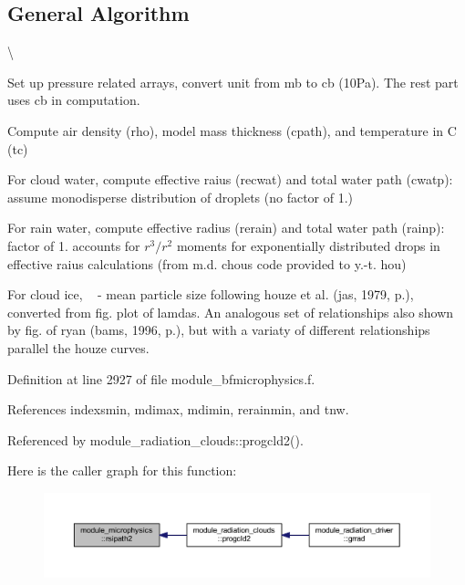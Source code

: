 \hypertarget{namespacemodule__radsw__main_general}{}\subsection{General Algorithm}\label{namespacemodule__radsw__main_general}
\textbackslash{} 
\begin{DoxyEnumerate}
\item Set up pressure related arrays, convert unit from mb to cb (10\+Pa). The rest part uses cb in computation.
\item Compute air density (rho), model mass thickness (cpath), and temperature in C (tc)
\item For cloud water, compute effective raius (recwat) and total water path (cwatp)\+: assume monodisperse distribution of droplets (no factor of 1.)
\item For rain water, compute effective radius (rerain) and total water path (rainp)\+: factor of 1. accounts for $ r^3/r^2 $ moments for exponentially distributed drops in effective raius calculations (from m.\+d. chou\textquotesingle{}s code provided to y.-\/t. hou)
\item For cloud ice, ~\newline
 -\/ mean particle size following houze et al. (jas, 1979, p.), converted from fig. plot of lamdas. An analogous set of relationships also shown by fig. of ryan (bams, 1996, p.), but with a variaty of different relationships parallel the houze curves. 
\end{DoxyEnumerate}

Definition at line 2927 of file module\+\_\+bfmicrophysics.\+f.



References indexsmin, mdimax, mdimin, rerainmin, and tnw.



Referenced by module\+\_\+radiation\+\_\+clouds\+::progcld2().



Here is the caller graph for this function\+:
\nopagebreak
\begin{figure}[H]
\begin{center}
\leavevmode
\includegraphics[width=350pt]{namespacemodule__microphysics_ac80bc526194e30c9e1a97e7833a2a77f_icgraph}
\end{center}
\end{figure}




